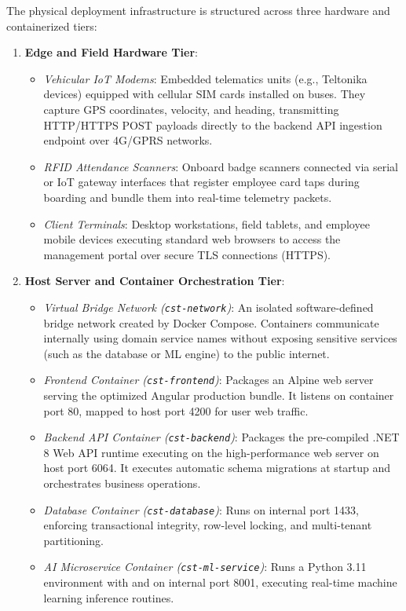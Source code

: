 The physical deployment infrastructure is structured across three hardware and containerized tiers:
\begin{enumerate}
  \item \textbf{Edge and Field Hardware Tier}:
  \begin{itemize}
    \item \emph{Vehicular IoT Modems}: Embedded telematics units (e.g., Teltonika devices) equipped with cellular SIM cards installed on buses. They capture GPS coordinates, velocity, and heading, transmitting HTTP/HTTPS POST payloads directly to the backend API ingestion endpoint over 4G/GPRS networks.
    \item \emph{RFID Attendance Scanners}: Onboard badge scanners connected via serial or IoT gateway interfaces that register employee card taps during boarding and bundle them into real-time telemetry packets.
    \item \emph{Client Terminals}: Desktop workstations, field tablets, and employee mobile devices executing standard web browsers to access the management portal over secure TLS connections (HTTPS).
  \end{itemize}

  \item \textbf{Host Server and Container Orchestration Tier}:
  \begin{itemize}
    \item \emph{Virtual Bridge Network (\texttt{cst-network})}: An isolated software-defined bridge network created by Docker Compose. Containers communicate internally using domain service names without exposing sensitive services (such as the database or ML engine) to the public internet.
    \item \emph{Frontend Container (\texttt{cst-frontend})}: Packages an  Alpine web server serving the optimized Angular production bundle. It listens on container port 80, mapped to host port 4200 for user web traffic.
    \item \emph{Backend API Container (\texttt{cst-backend})}: Packages the pre-compiled .NET 8 Web API runtime executing on the high-performance  web server on host port 6064. It executes automatic schema migrations at startup and orchestrates business operations.
    \item \emph{Database Container (\texttt{cst-database})}: Runs  on internal port 1433, enforcing transactional integrity, row-level locking, and multi-tenant partitioning.
    \item \emph{AI Microservice Container (\texttt{cst-ml-service})}: Runs a Python 3.11 environment with  and  on internal port 8001, executing real-time machine learning inference routines.
  \end{itemize}


\end{enumerate}
